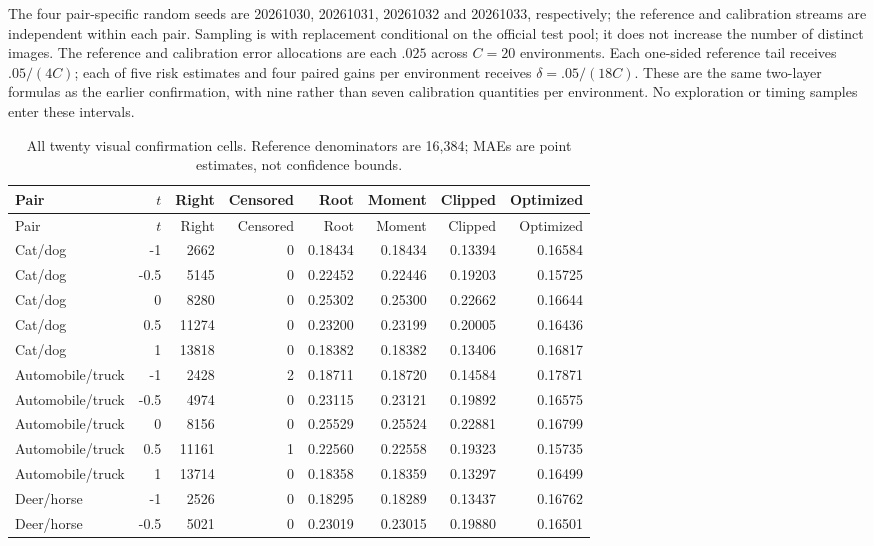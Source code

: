 The four pair-specific random seeds are 20261030, 20261031, 20261032 and 20261033, respectively; the reference and calibration streams are independent within each pair. Sampling is with replacement conditional on the official test pool; it does not increase the number of distinct images. The reference and calibration error allocations are each $.025$ across $C=20$ environments. Each one-sided reference tail receives $.05/(4C)$; each of five risk estimates and four paired gains per environment receives $\delta=.05/(18C)$. These are the same two-layer formulas as the earlier confirmation, with nine rather than seven calibration quantities per environment. No exploration or timing samples enter these intervals.


\begin{longtable}{lrrrrrrr}
\caption{All twenty visual confirmation cells. Reference denominators are 16,384; MAEs are point estimates, not confidence bounds.}\\
\toprule Pair & $t$ & Right & Censored & Root & Moment & Clipped & Optimized \\\midrule
\endfirsthead
\toprule Pair & $t$ & Right & Censored & Root & Moment & Clipped & Optimized \\\midrule
\endhead
Cat/dog & -1 & 2662 & 0 & 0.18434 & 0.18434 & 0.13394 & 0.16584 \\
Cat/dog & -0.5 & 5145 & 0 & 0.22452 & 0.22446 & 0.19203 & 0.15725 \\
Cat/dog & 0 & 8280 & 0 & 0.25302 & 0.25300 & 0.22662 & 0.16644 \\
Cat/dog & 0.5 & 11274 & 0 & 0.23200 & 0.23199 & 0.20005 & 0.16436 \\
Cat/dog & 1 & 13818 & 0 & 0.18382 & 0.18382 & 0.13406 & 0.16817 \\
Automobile/truck & -1 & 2428 & 2 & 0.18711 & 0.18720 & 0.14584 & 0.17871 \\
Automobile/truck & -0.5 & 4974 & 0 & 0.23115 & 0.23121 & 0.19892 & 0.16575 \\
Automobile/truck & 0 & 8156 & 0 & 0.25529 & 0.25524 & 0.22881 & 0.16799 \\
Automobile/truck & 0.5 & 11161 & 1 & 0.22560 & 0.22558 & 0.19323 & 0.15735 \\
Automobile/truck & 1 & 13714 & 0 & 0.18358 & 0.18359 & 0.13297 & 0.16499 \\
Deer/horse & -1 & 2526 & 0 & 0.18295 & 0.18289 & 0.13437 & 0.16762 \\
Deer/horse & -0.5 & 5021 & 0 & 0.23019 & 0.23015 & 0.19880 & 0.16501 \\

\end{longtable}
